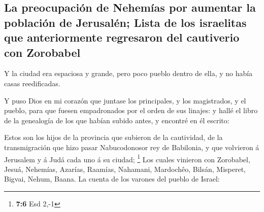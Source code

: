 \hypertarget{la-preocupaciuxf3n-de-nehemuxedas-por-aumentar-la-poblaciuxf3n-de-jerusaluxe9n-lista-de-los-israelitas-que-anteriormente-regresaron-del-cautiverio-con-zorobabel}{%
\subsection{La preocupación de Nehemías por aumentar la población de
Jerusalén; Lista de los israelitas que anteriormente regresaron del
cautiverio con
Zorobabel}\label{la-preocupaciuxf3n-de-nehemuxedas-por-aumentar-la-poblaciuxf3n-de-jerusaluxe9n-lista-de-los-israelitas-que-anteriormente-regresaron-del-cautiverio-con-zorobabel}}

 Y la ciudad era espaciosa y grande, pero poco pueblo
dentro de ella, y no había casas reedificadas.

 Y puso Dios en mi corazón que juntase los principales, y
los magistrados, y el pueblo, para que fuesen empadronados por el orden
de sus linajes: y hallé el libro de la genealogía de los que habían
subido antes, y encontré en él escrito:

 Estos son los hijos de la provincia que subieron de la
cautividad, de la transmigración que hizo pasar Nabucodonosor rey de
Babilonia, y que volvieron á Jerusalem y á Judá cada uno á su ciudad;
\footnote{\textbf{7:6} Esd 2,-1}  Los cuales vinieron con
Zorobabel, Jesuá, Nehemías, Azarías, Raamías, Nahamani, Mardochêo,
Bilsán, Misperet, Bigvai, Nehum, Baana. La cuenta de los varones del
pueblo de Israel:

